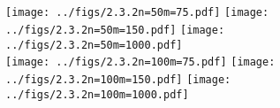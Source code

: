 \documentclass{article}
\begin{document}
        \subsection{}
        \begin{figure}[hbt!]
            \centering
            \texttt{[image: ../figs/2.3.2n=50m=75.pdf]}
            \texttt{[image: ../figs/2.3.2n=50m=150.pdf]}
            \texttt{[image: ../figs/2.3.2n=50m=1000.pdf]}\\
            \texttt{[image: ../figs/2.3.2n=100m=75.pdf]}
            \texttt{[image: ../figs/2.3.2n=100m=150.pdf]}
            \texttt{[image: ../figs/2.3.2n=100m=1000.pdf]}
            \caption{}
            \label{fig:2.4}
        \end{figure}

        
        \subsection{}
\end{document}

